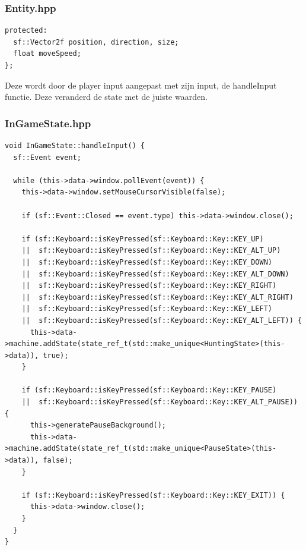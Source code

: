 \documentclass{report}
\begin{document}
    \subsubsection{Entity.hpp} %
    \label{ssub:entity_hpp}

    \begin{verbatim}
protected:
  sf::Vector2f position, direction, size;
  float moveSpeed;
};
    \end{verbatim}
    Deze wordt door de player input aangepast met zijn input, de handleInput functie. Deze veranderd de state met de juiste waarden.
    \subsubsection{InGameState.hpp} %
    \label{ssub:ingamestate_hpp}

    \begin{verbatim}
void InGameState::handleInput() {
  sf::Event event;

  while (this->data->window.pollEvent(event)) {
    this->data->window.setMouseCursorVisible(false);

    if (sf::Event::Closed == event.type) this->data->window.close();

    if (sf::Keyboard::isKeyPressed(sf::Keyboard::Key::KEY_UP)
    ||  sf::Keyboard::isKeyPressed(sf::Keyboard::Key::KEY_ALT_UP)
    ||  sf::Keyboard::isKeyPressed(sf::Keyboard::Key::KEY_DOWN)
    ||  sf::Keyboard::isKeyPressed(sf::Keyboard::Key::KEY_ALT_DOWN)
    ||  sf::Keyboard::isKeyPressed(sf::Keyboard::Key::KEY_RIGHT)
    ||  sf::Keyboard::isKeyPressed(sf::Keyboard::Key::KEY_ALT_RIGHT)
    ||  sf::Keyboard::isKeyPressed(sf::Keyboard::Key::KEY_LEFT)
    ||  sf::Keyboard::isKeyPressed(sf::Keyboard::Key::KEY_ALT_LEFT)) {
      this->data->machine.addState(state_ref_t(std::make_unique<HuntingState>(this->data)), true);
    }

    if (sf::Keyboard::isKeyPressed(sf::Keyboard::Key::KEY_PAUSE)
    ||  sf::Keyboard::isKeyPressed(sf::Keyboard::Key::KEY_ALT_PAUSE)) {
      this->generatePauseBackground();
      this->data->machine.addState(state_ref_t(std::make_unique<PauseState>(this->data)), false);
    }

    if (sf::Keyboard::isKeyPressed(sf::Keyboard::Key::KEY_EXIT)) {
      this->data->window.close();
    }
  }
}
    \end{verbatim}
\end{document}
